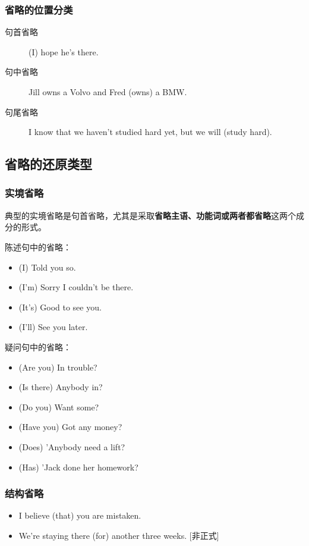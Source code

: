 \subsubsection{省略的位置分类}

\begin{description}
\item[句首省略] (I) hope he's there.
\item[句中省略] Jill owns a Volvo and Fred (owns) a BMW.
\item[句尾省略] I know that we haven't studied hard yet, but we will (study hard).
\end{description}

\subsection{省略的还原类型}

\subsubsection{实境省略}

典型的实境省略是句首省略，尤其是采取\textbf{省略主语、功能词或两者都省略}这两个成
分的形式。

陈述句中的省略：
\begin{itemize}
\item (I) Told you so.
\item (I'm) Sorry I couldn't be there.
\item (It's) Good to see you.
\item (I'll) See you later.
\end{itemize}

疑问句中的省略：
\begin{itemize}
\item (Are you) In trouble?
\item (Is there) Anybody in?
\item (Do you) Want some?
\item (Have you) Got any money?
\item (Does) 'Anybody need a lift?
\item (Has) 'Jack done her homework?
\end{itemize}

\subsubsection{结构省略}

\begin{itemize}
\item I believe (that) you are mistaken.
\item We're staying there (for) another three weeks. [非正式]
\end{itemize}
